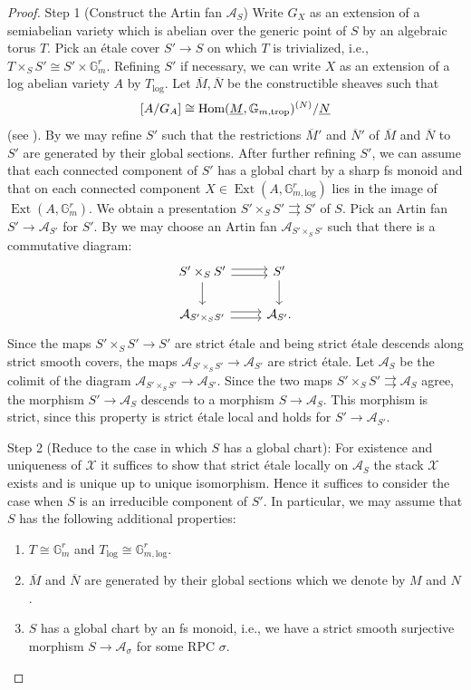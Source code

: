 \documentclass[11pt]{amsart}
\theoremstyle{definition}
\theoremstyle{remark}
\DeclareMathOperator{\Ext}{Ext}
\def\log{\mathrm{log}}
\def\trop{\mathrm{trop}}
\DeclareMathOperator{\Hom}{\textup{Hom}}
\begin{document}
\begin{proof}
	Step 1 (Construct the Artin fan $\mathcal{A}_S$) Write $G_X$ as an extension of a semiabelian
	variety which is abelian over the generic point of $S$ by an algebraic torus $T$. Pick an étale cover $S'\to S$ on which $T$
	is trivialized, i.e., $T\times_{S}S'\cong S'\times \mathbb{G}_m^{r}$.
	Refining $S'$ if necessary, we can write $X$ as an extension of a log abelian variety $A$ by $T_{\log}$.
	Let $\overline{M},\overline{N}$ be the constructible sheaves
	such that
	$$[A/G_A]\cong \Hom(\underline{M},\mathbb{G}_{m,\trop})^{(N)}/\underline{N}$$
	(see \cite[4.4]{LogarithmicAbeKajiwa2008}). By \cite[4.1.2]{LogarithmicAbeKajiwa2008}
	we may refine $S'$ such that the restrictions $\overline{M}'$
	and $\overline{N}'$ of $\overline{M}$ and $\overline{N}$ to $S'$
	are generated by their global sections. After further refining
	$S'$, we can assume that each connected component of $S'$ has a
	global chart by a sharp fs monoid and that on each connected
	component $X\in \Ext(A,\mathbb{G}_{m,\log}^{r})$ lies in the image of
	$\Ext(A,\mathbb{G}_{m}^{r})$. We obtain a presentation
	$S'\times_S S'\rightrightarrows S'$ of $S$. Pick an Artin
	fan $S'\to \mathcal{A}_{S'}$ for $S'$. By
	\cite[Theorem 5.7]{SkeletonsAndFAbramo2015} we may choose
	an Artin fan $\mathcal{A}_{S'\times_S S'}$ such that there
	is a commutative diagram:
	$$\begin{tikzcd}
		S'\times_S S'\arrow[d]\arrow[r,shift left]\arrow[r,shift right]&S'\arrow[d]\\
		\mathcal{A}_{S'\times_S S'}\arrow[r,shift left]\arrow[r,shift right]&\mathcal{A}_{S'}.
	\end{tikzcd}$$
	Since the maps $S'\times_S S'\to S'$ are strict étale and being strict
	étale descends along strict smooth covers, the maps
	$\mathcal{A}_{S'\times_S S'}\to \mathcal{A}_{S'}$ are strict
	étale. Let $\mathcal{A}_{S}$ be the colimit of the diagram
	$\mathcal{A}_{S'\times_S S'}\to \mathcal{A}_{S'}$. Since the
	two maps $S'\times_S S'\rightrightarrows \mathcal{A}_S$ agree,
	the morphism $S'\to \mathcal{A}_S$ descends to a morphism
	$S\to \mathcal{A}_{S}$. This morphism is strict, since this property
	is strict étale local and holds for $S'\to \mathcal{A}_{S'}$.

	Step 2 (Reduce to the case in which $S$ has a global chart): For existence and uniqueness of $\mathcal{X}$ it suffices to show
	that strict étale locally on $\mathcal{A}_S$ the stack $\mathcal{X}$ exists
	and is unique up to unique isomorphism.
	Hence it suffices to consider the case
	when $S$ is an irreducible component of $S'$. In particular, we
	may assume that $S$ has the following additional properties:
	\begin{enumerate}
		\item $T\cong \mathbb{G}_{m}^{r}$ and $T_{\log}\cong \mathbb{G}_{m,\log}^{r}$.
		\item $\overline{M}$ and $\overline{N}$ are generated by their global sections which we denote by $M$ and $N$.
		\item $S$ has a global chart by an fs monoid, i.e., we have a strict smooth surjective morphism $S\to \mathcal{A}_{\sigma}$ for some RPC $\sigma$.
	\end{enumerate}


\end{proof}
\end{document}
